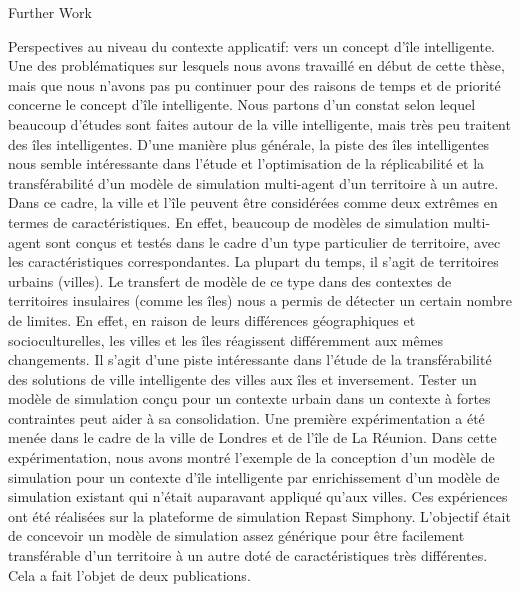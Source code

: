 \begin{frame}{Further Work}
{{\par Perspectives au niveau du contexte applicatif: vers un concept d’île intelligente. Une des problématiques sur lesquels nous avons travaillé en début de cette thèse, mais que nous n'avons pas pu continuer pour des raisons de temps et de priorité concerne le concept d'île intelligente. Nous partons d'un constat selon lequel beaucoup d'études sont faites autour de la ville intelligente, mais très peu traitent des îles intelligentes. D'une manière plus générale, la piste des îles intelligentes nous semble intéressante dans l'étude et l'optimisation de la réplicabilité et la transférabilité d'un modèle de simulation multi-agent d'un territoire à un autre. Dans ce cadre, la ville et l'île peuvent être considérées comme deux extrêmes en termes de caractéristiques. En effet, beaucoup de modèles de simulation multi-agent sont conçus et testés dans le cadre d'un type particulier de territoire, avec les caractéristiques correspondantes. La plupart du temps, il s'agit de territoires urbains (villes). Le transfert de modèle de ce type dans des contextes de territoires insulaires (comme les îles) nous a permis de détecter un certain nombre de limites. En effet, en raison de leurs différences géographiques et socioculturelles, les villes et les îles réagissent différemment aux mêmes changements. Il s'agit d'une piste intéressante dans l'étude de la transférabilité des solutions de ville intelligente des villes aux îles et inversement. Tester un modèle de simulation conçu pour un contexte urbain dans un contexte à fortes contraintes peut aider à sa consolidation. Une première expérimentation a été menée dans le cadre de la ville de Londres et de l'île de La Réunion. Dans cette expérimentation, nous avons montré l'exemple de la conception d'un modèle de simulation pour un contexte d'île intelligente par enrichissement d'un modèle de simulation existant qui n'était auparavant appliqué qu'aux villes. Ces expériences ont été réalisées sur la plateforme de simulation Repast Simphony. L'objectif était de concevoir un modèle de simulation assez générique pour être facilement transférable d'un territoire à un autre doté de caractéristiques très différentes. Cela a fait l'objet de deux publications.

}}
\end{frame}